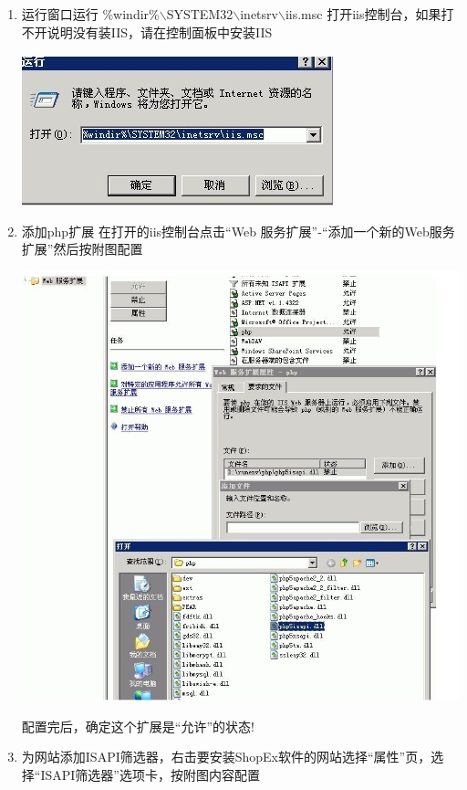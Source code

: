 \documentclass{article}
\begin{document}
\begin{enumerate}
\item 运行窗口运行 \%windir\%$\backslash$SYSTEM32$\backslash$inetsrv$\backslash$iis.msc 打开iis控制台，如果打不开说明没有装IIS，请在控制面板中安装IIS 

\includegraphics{img/install/windows/iis/3.jpg}

\item 添加php扩展 在打开的iis控制台点击“Web 服务扩展”-“添加一个新的Web服务扩展”然后按附图配置

\includegraphics{img/install/windows/iis/4.jpg}

配置完后，确定这个扩展是“允许”的状态!

\item 为网站添加ISAPI筛选器，右击要安装ShopEx软件的网站选择“属性”页，选择“ISAPI筛选器”选项卡，按附图内容配置


\end{enumerate}
\end{document}
